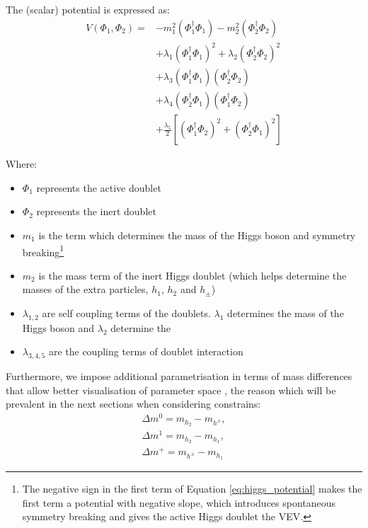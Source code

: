 \documentclass[12pt]{article}
\begin{document}
The (scalar) potential is expressed as:
\begin{equation}
    \begin{split}
        V(\Phi_1, \Phi_2) =& -m_1^2(\Phi_1^\dagger\Phi_1) - m_2^2(\Phi_2^\dagger\Phi_2)\\ 
        &+ \lambda_1(\Phi_1^\dagger\Phi_1)^2 + \lambda_2(\Phi_2^\dagger\Phi_2)^2 \\
        &+ \lambda_3(\Phi_1^\dagger\Phi_1)(\Phi_2^\dagger\Phi_2) \\
        &+ \lambda_4(\Phi_2^\dagger\Phi_1)(\Phi_1^\dagger\Phi_2)\\ 
        &+ \frac{\lambda_5}{2}[(\Phi_1^\dagger\Phi_2)^2 + (\Phi_2^\dagger\Phi_1)^2]
        \end{split}
        \label{eq:higgs_potential}
\end{equation}

Where:
\begin{itemize}
    \item $\Phi_1$ represents the active doublet
    \item $\Phi_2$ represents the inert doublet
    \item $m_1$ is the term which determines the mass of the Higgs boson and symmetry breaking\footnote{The negative sign in the first term of Equation \ref{eq:higgs_potential} makes the first term a potential with negative slope, which introduces spontaneous symmetry breaking and gives the active Higgs doublet the VEV.}
    \item $m_2$ is the mass term of the inert Higgs doublet (which helps determine the masses of the extra particles, $h_1$, $h_2$ and $h_\pm$)
    \item $\lambda_{1, 2}$ are self coupling terms of the doublets. $\lambda_1$ determines the mass of the Higgs boson and $\lambda_2$ determine the 
    \item $\lambda_{3, 4, 5}$ are the coupling terms of doublet interaction
\end{itemize}
Furthermore, we impose additional parametrisation in terms of mass differences that allow better visualisation of parameter space \cite{Belyaev_2022}, the reason which will be prevalent in the next sections when considering constrains:
\begin{align}
\label{eq:mass_diff_1}
    \Delta m^{0} = m_{h_2} - m_{h^\pm},\\
    \Delta m^1 = m_{h_2} - m_{h_1},\\
    \Delta m^+ = m_{h^\pm} - m_{h_1}
\end{align}
\end{document}

